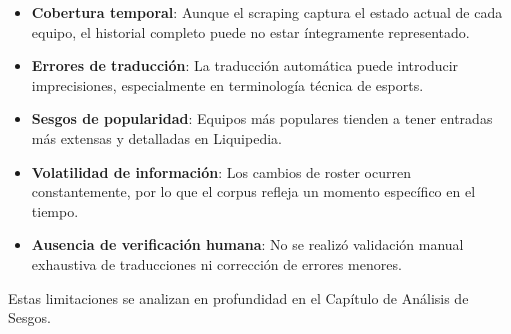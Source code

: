 \begin{itemize}
    \item \textbf{Cobertura temporal}: Aunque el scraping captura el estado actual de cada equipo, el historial completo puede no estar íntegramente representado.
    
    \item \textbf{Errores de traducción}: La traducción automática puede introducir imprecisiones, especialmente en terminología técnica de esports.
    
    \item \textbf{Sesgos de popularidad}: Equipos más populares tienden a tener entradas más extensas y detalladas en Liquipedia.
    
    \item \textbf{Volatilidad de información}: Los cambios de roster ocurren constantemente, por lo que el corpus refleja un momento específico en el tiempo.
    
    \item \textbf{Ausencia de verificación humana}: No se realizó validación manual exhaustiva de traducciones ni corrección de errores menores.
\end{itemize}

Estas limitaciones se analizan en profundidad en el Capítulo de Análisis de Sesgos.

